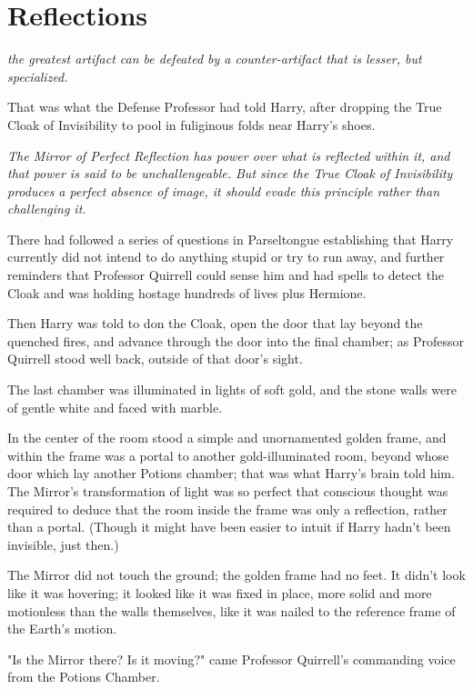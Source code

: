 \chapter{Reflections}

 \emph{the 
greatest artifact can be defeated by a counter-artifact that is lesser, but 
specialized.}

That was what the Defense Professor had told Harry, after dropping the True 
Cloak of Invisibility to pool in fuliginous folds near Harry's shoes.

\emph{The Mirror of Perfect Reflection has power over what is reflected within 
it, and that power is said to be unchallengeable. But since the True Cloak of 
Invisibility produces a perfect absence of image, it should evade this 
principle rather than challenging it.}

There had followed a series of questions in Parseltongue establishing that 
Harry currently did not intend to do anything stupid or try to run away, and 
further reminders that Professor Quirrell could sense him and had spells to 
detect the Cloak and was holding hostage hundreds of lives plus Hermione.

Then Harry was told to don the Cloak, open the door that lay beyond the 
quenched fires, and advance through the door into the final chamber; as 
Professor Quirrell stood well back, outside of that door's sight.

The last chamber was illuminated in lights of soft gold, and the stone walls 
were of gentle white and faced with marble.

In the center of the room stood a simple and unornamented golden frame, and 
within the frame was a portal to another gold-illuminated room, beyond whose 
door which lay another Potions chamber; that was what Harry's brain told him. 
The Mirror's transformation of light was so perfect that conscious thought was 
required to deduce that the room inside the frame was only a reflection, rather 
than a portal. (Though it might have been easier to intuit if Harry hadn't been 
invisible, just then.)

The Mirror did not touch the ground; the golden frame had no feet. It didn't 
look like it was hovering; it looked like it was fixed in place, more solid and 
more motionless than the walls themselves, like it was nailed to the reference 
frame of the Earth's motion.

"Is the Mirror there? Is it moving?" came Professor Quirrell's commanding voice 
from the Potions Chamber.

